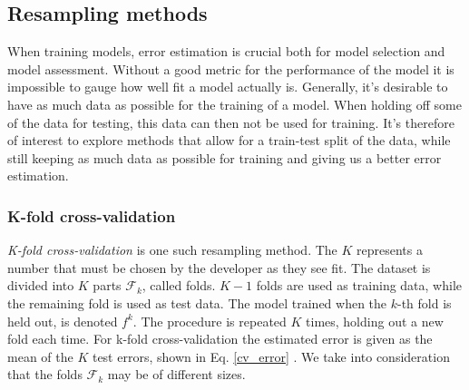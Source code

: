 




\subsection{Resampling methods}

When training models, error estimation is crucial both for model selection and model assessment. Without a good metric for the performance of the model it is impossible to gauge how well fit a model actually is.
Generally, it's desirable to have as much data as possible for the training of a model. When holding off some of the data for testing, this data can then not be used for training. It's therefore of interest to explore methods that allow for a train-test split of the data, while still keeping as much data as possible for training and giving us a better error estimation.

\subsubsection{K-fold cross-validation}
\textit{K-fold cross-validation} is one such resampling method. The $K$ represents a number that must be chosen by the developer as they see fit. The dataset is divided into $K$ parts $\mathcal{F}_k$, called folds. $K-1$ folds are used as training data, while the remaining fold is used as test data. The model trained when the $k$-th fold is held out, is denoted $f^{k}$. 
The procedure is repeated $K$ times, holding out a new fold each time. For k-fold cross-validation the estimated error is given as the mean of the $K$ test errors, shown in Eq. \ref{cv_error} \citep[p. 241]{hastie}. We take into consideration that the folds $\mathcal{F}_k$ may be of different sizes.


